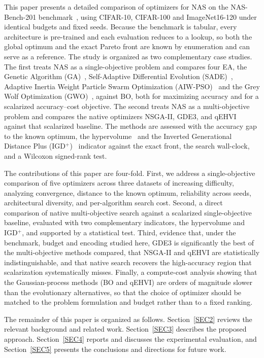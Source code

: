 \documentclass[runningheads]{llncs}
\begin{document}
This paper presents a detailed comparison of optimizers for NAS on the NAS-Bench-201 benchmark~\cite{dong2020nasbench201}, using CIFAR-10, CIFAR-100 and ImageNet16-120 under identical budgets and fixed seeds. Because the benchmark is tabular, every architecture is pre-trained and each evaluation reduces to a lookup, so both the global optimum and the exact Pareto front are known by enumeration and can serve as a reference. The study is organized as two complementary case studies. The first treats NAS as a single-objective problem and compares four EA, the Genetic Algorithm (GA)~\cite{goldberg1989genetic}, Self-Adaptive Differential Evolution (SADE)~\cite{qin2009sade}, Adaptive Inertia Weight Particle Swarm Optimization (AIW-PSO)~\cite{qin2006aiwpso} and the Grey Wolf Optimization (GWO)~\cite{mirjalili2014gwo}, against BO, both for maximizing accuracy and for a scalarized accuracy--cost objective. The second treats NAS as a multi-objective problem and compares the native optimizers NSGA-II, GDE3, and qEHVI against that scalarized baseline. The methods are assessed with the accuracy gap to the known optimum, the hypervolume~\cite{zitzler1999hv} and the Inverted Generational Distance Plus (IGD$^{+}$)~\cite{ishibuchi2015igdplus} indicator against the exact front, the search wall-clock, and a Wilcoxon signed-rank test.

The contributions of this paper are four-fold. First, we address a single-objective comparison of five optimizers across three datasets of increasing difficulty, analyzing convergence, distance to the known optimum, reliability across seeds, architectural diversity, and per-algorithm search cost. Second, a direct comparison of native multi-objective search against a scalarized single-objective baseline, evaluated with two complementary indicators, the hypervolume and IGD$^{+}$, and supported by a statistical test. Third, evidence that, under the benchmark, budget and encoding studied here, GDE3 is significantly the best of the multi-objective methods compared, that NSGA-II and qEHVI are statistically indistinguishable, and that native search recovers the high-accuracy region that scalarization systematically misses. Finally, a compute-cost analysis showing that the Gaussian-process methods (BO and qEHVI) are orders of magnitude slower than the evolutionary alternatives, so that the choice of optimizer should be matched to the problem formulation and budget rather than to a fixed ranking.

The remainder of this paper is organized as follows. Section~\ref{SEC2} reviews the relevant background and related work. Section~\ref{SEC3} describes the proposed approach. Section~\ref{SEC4} reports and discusses the experimental evaluation, and Section~\ref{SEC5} presents the conclusions and directions for future work.
\end{document}
